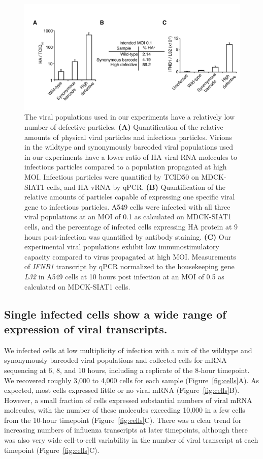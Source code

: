 \documentclass[9pt,lineno]{elife}
\begin{document}
\begin{figure}
\includegraphics[width=0.7\linewidth]{figures/Validating_barcode_virus/validating_populations_D02.pdf}
\caption{\label{fig:viruspopulations} The viral populations used in our experiments have a relatively low number of defective particles. 
{\bf (A)}
Quantification of the relative amounts of physical viral particles and infectious particles.
Virions in the wildtype and synonymously barcoded viral populations used in our experiments have a lower ratio of HA viral RNA molecules to infectious particles compared to a population propagated at high MOI.
Infectious particles were quantified by TCID50 on MDCK-SIAT1 cells, and HA vRNA by qPCR. 
{\bf (B)} 
Quantification of the relative amounts of particles capable of expressing one specific viral gene to infectious particles.
A549 cells were infected with all three viral populations at an MOI of 0.1 as calculated on MDCK-SIAT1 cells, and the percentage of infected cells expressing HA protein at 9 hours post-infection was quantified by antibody staining.
{\bf (C)} Our experimental viral populations exhibit low immunostimulatory capacity compared to virus propagated at high MOI. 
Measurements of \emph{IFNB1} transcript by qPCR normalized to the housekeeping gene \emph{L32} in A549 cells at 10 hours post infection at an MOI of 0.5 as calculated on MDCK-SIAT1 cells.}
\end{figure}

\subsection{Single infected cells show a wide range of expression of viral transcripts.}
We infected cells at low multiplicity of infection with a mix of the wildtype and synonymously barcoded viral populations and collected cells for mRNA sequencing at 6, 8, and 10 hours, including a replicate of the 8-hour timepoint.
We recovered roughly 3,000 to 4,000 cells for each sample (Figure~\ref{fig:cells}A). 
As expected, most cells expressed little or no viral mRNA (Figure~\ref{fig:cells}B).
However, a small fraction of cells expressed substantial numbers of viral mRNA molecules, with the number of these molecules exceeding 10,000 in a few cells from the 10-hour timepoint (Figure~\ref{fig:cells}C). 
There was a clear trend for increasing numbers of influenza transcripts at later timepoints, although there was also very wide cell-to-cell variability in the number of viral transcript at each timepoint (Figure~\ref{fig:cells}C).
\end{document}
